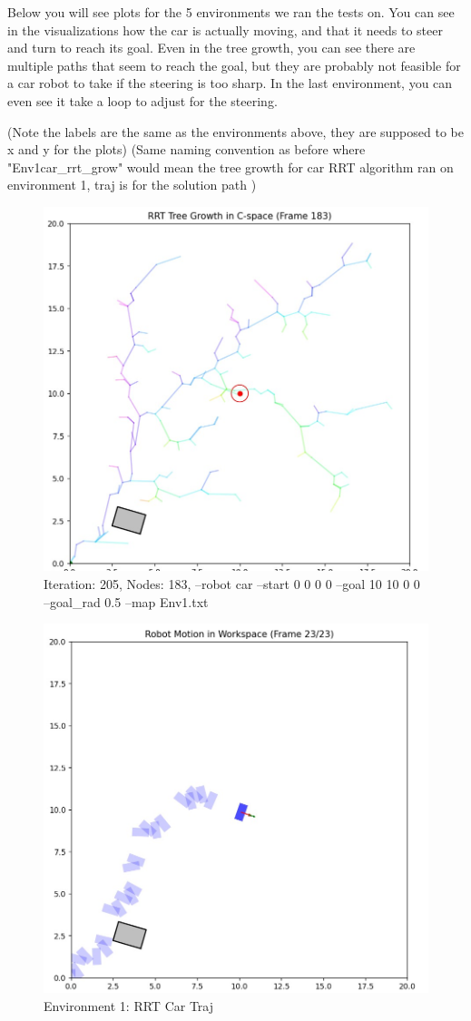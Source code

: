\documentclass{article}
\begin{document}
Below you will see plots for the 5 environments we ran the tests on. You can see in the visualizations how the car is actually moving, and that it needs to steer and turn to reach its goal. Even in the tree growth, you can see there are multiple paths that seem to reach the goal, but they are probably not feasible for a car robot to take if the steering is too sharp. In the last environment, you can even see it take a loop to adjust for the steering.  

(Note the labels are the same as the environments above, they are supposed to be x and y for the plots) (Same naming convention as before where "Env1car\_rrt\_grow" would mean the tree growth for car RRT algorithm ran on environment 1, traj is for the solution path )

\begin{figure} [H]
    \centering
    \includegraphics[width=0.5\linewidth]{latex_media/Env1Car_rrt_grow.jpg}
    \caption{Iteration: 205, Nodes: 183, --robot car --start 0 0 0 0 --goal 10 10 0 0 --goal\_rad 0.5 --map Env1.txt}
\end{figure}

\begin{figure} [H]
    \centering
    \includegraphics[width=0.5\linewidth]{latex_media/Env1Car_rrt_traj.jpg}
    \caption{Environment 1: RRT Car Traj}
\end{figure}
\end{document}
